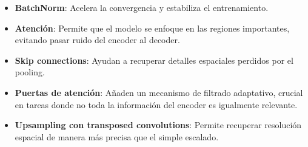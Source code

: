 \begin{enumerate}
\begin{itemize}
\begin{itemize}
    \item \textbf{BatchNorm}: Acelera la convergencia y estabiliza el entrenamiento.
    \item \textbf{Atención}: Permite que el modelo se enfoque en las regiones importantes, evitando pasar ruido del encoder al decoder.
    \item \textbf{Skip connections}: Ayudan a recuperar detalles espaciales perdidos por el pooling.
    \item \textbf{Puertas de atención}: Añaden un mecanismo de filtrado adaptativo, crucial en tareas donde no toda la información del encoder es igualmente relevante.
      
      

    \item \textbf{Upsampling con transposed convolutions}: Permite recuperar resolución espacial de manera más precisa que el simple escalado.
\end{itemize}



\end{itemize}
\end{enumerate}
